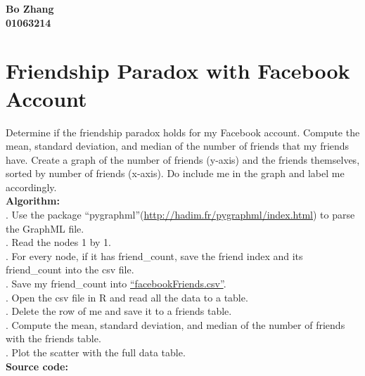 \documentclass{article}
\begin{document}
		\begin{center}\textbf{Bo Zhang\\01063214\\}
		\end{center}
		\section{Friendship Paradox with Facebook Account}
		Determine if the friendship paradox holds for my Facebook account. Compute the mean, standard deviation, and median of the number of friends that my friends have. Create a graph of the number of friends (y-axis) and the friends themselves, sorted by number of friends (x-axis). Do include me in the graph and label me accordingly.\\

		\noindent\textbf{Algorithm: }\\
		. Use the package ``pygraphml''(\url{http://hadim.fr/pygraphml/index.html}) to parse the GraphML file.\\
		. Read the nodes 1 by 1.\\
		. For every node, if it has friend\_count, save the friend index and its friend\_count into the csv file.\\
		. Save my friend\_count into \href{https://github.com/zhangboroy/cs532-s17/blob/master/assg04_submission/facebookFriends.csv}{``facebookFriends.csv''}.\\
		. Open the csv file in R and read all the data to a table.\\
		. Delete the row of me and save it to a friends table.\\
		. Compute the mean, standard deviation, and median of the number of friends with the friends table.\\
		. Plot the scatter with the full data table.\\

		\noindent\textbf{Source code:}
		
		\pagebreak

		
\end{document}
